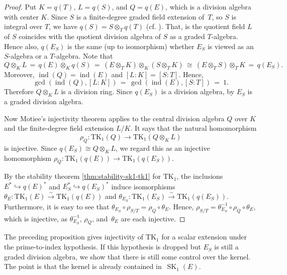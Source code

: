 \documentclass[11pt]{article}
\numberwithin{equation}{section}
\theoremstyle{plain}
\theoremstyle{remark}
\newcommand{\opn}{\operatorname}
\newcommand{\TK}{\opn{TK_1}}
\begin{document}
\begin{proof}
Put $K=q(T)$, $L=q(S)$, and $Q=q(E)$, which is a division algebra with center $K$.
 Since $S$ is a finite-degree  graded field extension of~$T$, so $S$ is 
integral over $T$, we have $q(S) = S\otimes_T q(T)$ (cf. \cite[Lemma~2.15]{tignol-wadsworth-2015}). That, is the 
quotient field 
$L$ of $S$ coincides with the quotient division algebra of $S$ as a graded $T$-algebra.  Hence also, $q(E_S)$ 
is the same (up to isomorphism) whether $E_S$ is viewed as an $S$-algebra or a $T$-algebra.  Note that
\begin{equation}
\label{q(E_S)}
Q\otimes_K L \,= \, q(E) \otimes_K q(S) \, = \, (E \otimes_T K)\otimes _K (S\otimes _T K) \,
\cong \, (E \otimes _T S) \otimes _T K \, = \, q(E_S).
\end{equation}
Moreover, 
$\opn{ind}(Q)=\opn{ind}(E)$ and $[L:K]=[S:T]$. Hence, 
\begin{equation}
\label{gcds}
\gcd(\opn{ind}(Q),[L:K]) \,=\,\gcd(\opn{ind}(E),[S:T])\,=\ 1.
\end{equation}
Therefore $Q\otimes _K L$ is a division ring. Since $q(E_S)$ is a division algebra, by 
\cite[Prop.~2.28]{tignol-wadsworth-2015} $E_S$ is a graded division algebra.


Now Motiee's injectivity theorem \cite[Th.~7]{motiee-2013} applies to the  central division algebra $Q$ over 
$K$ and the finite-degree field extension $L/K$. It says that the natural homomorphism
$$
        \rho_Q:\mathrm{TK}_1(Q)\longrightarrow \mathrm{TK}_1(Q\otimes_K L)
$$
is injective. Since $q(E_S)\cong Q\otimes_K L$, we regard this as an injective homomorphism
$
        \rho_Q:\mathrm{TK}_1(q(E))\longrightarrow \mathrm{TK}_1(q(E_S)).
$

By the stability theorem \ref{thm:stability-sk1-tk1} for $\mathrm{TK}_1$, the inclusions $E^*\hookrightarrow q(E)^*$ 
and $E_S^*\hookrightarrow q(E_S)^*$ induce isomorphisms
$
        \theta_E:\mathrm{TK}_1(E)\overset{\sim}{\longrightarrow}\mathrm{TK}_1(q(E))
 $
 and
 $       
        \theta_{E_S}:\mathrm{TK}_1(E_S)\overset{\sim}{\longrightarrow}\mathrm{TK}_1(q(E_S)).
$
Furthermore, it is easy to see that $\theta_{E_S}\circ \rho_{S/T}=\rho_Q\circ\theta_E$.
Hence, $\rho_{S/T}= \theta_{E_S}^{-1}\circ \rho_Q\circ\theta_E$, which is injective, 
as $\theta_{E_S}^{-1}$, $ \rho_Q$, and~$\theta_E$ are each injective.
\end{proof}

The preceding proposition gives injectivity of $\TK$ for a scalar extension
under the prime-to-index hypothesis.  If this hypothesis is dropped but $E_S$ is still a graded division algebra, 
we show that there is still some control over the kernel. The point is that the kernel is already contained 
in~$\opn{SK}_1(E)$.
\end{document}

